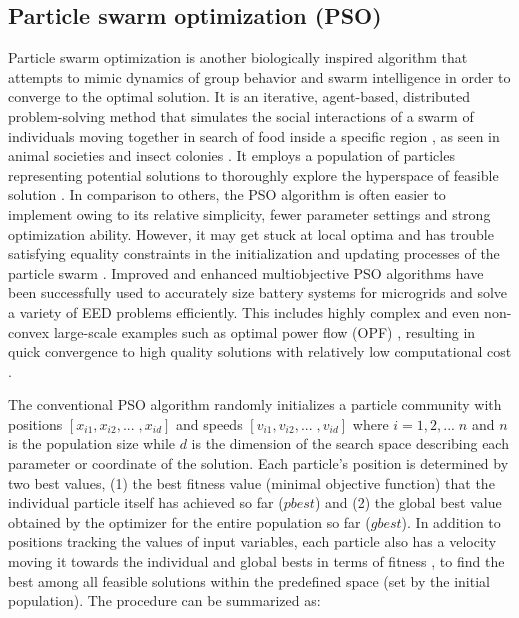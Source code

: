 \documentclass[final,3p,times]{elsarticle}
\begin{document}
\subsection{Particle swarm optimization (PSO) \label{app:pso}}

Particle swarm optimization is another biologically inspired algorithm that attempts to mimic dynamics of group behavior and swarm intelligence in order to converge to the optimal solution. It is an iterative, agent-based, distributed problem-solving method that simulates the social interactions of a swarm of individuals moving together in search of food inside a specific region \cite{fathima2015}, as seen in animal societies and insect colonies \cite{pathak2017}. It employs a population of particles representing potential solutions to thoroughly explore the hyperspace of feasible solution \cite{alrashidi2010}. In comparison to others, the PSO algorithm is often easier to implement owing to its relative simplicity, fewer parameter settings and strong optimization ability. However, it may get stuck at local optima and has trouble satisfying equality constraints in the initialization and updating processes of the particle swarm \cite{wu2014}. Improved and enhanced multiobjective PSO algorithms have been successfully used to accurately size battery systems for microgrids and solve a variety of EED problems efficiently. This includes highly complex and even non-convex large-scale examples such as optimal power flow (OPF) \cite{alrashidi2010}, resulting in quick convergence to high quality solutions with relatively low computational cost \cite{pathak2017}.

The conventional PSO algorithm randomly initializes a particle community with positions $[x_{i1}, x_{i2}, ... \; , x_{id}]$ and speeds $[v_{i1}, v_{i2}, ... \;, v_{id}]$ where $i = 1,2,... \; n$ and $n$ is the population size while $d$ is the dimension of the search space describing each parameter or coordinate of the solution. Each particle's position is determined by two best values, (1) the best fitness value (minimal objective function) that the individual particle itself has achieved so far ($pbest$) and (2) the global best value obtained by the optimizer for the entire population so far ($gbest$). In addition to positions tracking the values of input variables, each particle also has a velocity moving it towards the individual and global bests in terms of fitness \cite{borhanazad2014}, to find the best among all feasible solutions within the predefined space (set by the initial population). The procedure can be summarized as:
\end{document}
